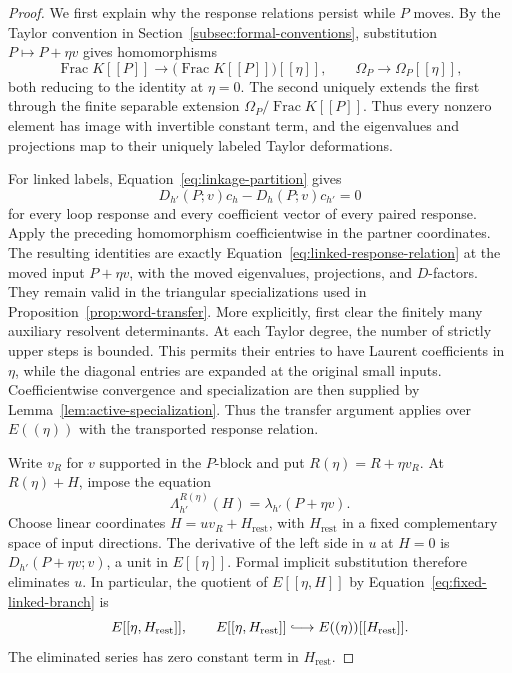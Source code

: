 \begin{proof}
We first explain why the response relations persist while $P$ moves.
By the Taylor convention in Section~\ref{subsec:formal-conventions},
substitution $P\mapsto P+\eta v$ gives homomorphisms
\[
 \operatorname{Frac}K[[P]]
 \longrightarrow \bigl(\operatorname{Frac}K[[P]]\bigr)[[\eta]],
 \qquad
 \Omega_P\longrightarrow\Omega_P[[\eta]],
\]
both reducing to the identity at $\eta=0$. The second uniquely
extends the first through the finite separable extension
$\Omega_P/\operatorname{Frac}K[[P]]$. Thus every nonzero element
has image with invertible constant term, and the eigenvalues and
projections map to their uniquely labeled Taylor deformations.

For linked labels, Equation~\eqref{eq:linkage-partition} gives
\begin{equation}
 D_{h'}(P;v)c_h-D_h(P;v)c_{h'}=0
 \label{eq:linked-response-relation}
\end{equation}
for every loop response and every coefficient vector of every paired
response.  Apply the preceding homomorphism coefficientwise in the
partner coordinates.  The resulting identities are exactly
Equation~\eqref{eq:linked-response-relation} at the moved input
$P+\eta v$, with the moved eigenvalues, projections, and $D$-factors.
They remain valid in the triangular specializations used in
Proposition~\ref{prop:word-transfer}.  More explicitly, first clear the
finitely many auxiliary resolvent determinants.  At each Taylor degree,
the number of strictly upper steps is bounded.  This permits their
entries to have Laurent coefficients in $\eta$, while the diagonal
entries are expanded at the original small inputs.  Coefficientwise
convergence and specialization are then supplied by
Lemma~\ref{lem:active-specialization}.  Thus the transfer argument
applies over $E((\eta))$ with the transported response relation.

Write $v_R$ for $v$ supported in the $P$-block and put
$R(\eta)=R+\eta v_R$.  At $R(\eta)+H$, impose the equation
\begin{equation}
 \Lambda_{h'}^{R(\eta)}(H)=\lambda_{h'}(P+\eta v).
 \label{eq:fixed-linked-branch}
\end{equation}
Choose linear coordinates $H=u v_R+H_{\mathrm{rest}}$, with
$H_{\mathrm{rest}}$ in a fixed complementary space of input directions.
The derivative of the left side in $u$ at $H=0$ is
$D_{h'}(P+\eta v;v)$, a unit in $E[[\eta]]$.  Formal implicit
substitution therefore eliminates $u$.  In particular, the quotient
of $E[[\eta,H]]$ by Equation~\eqref{eq:fixed-linked-branch} is
\begin{equation}
 E[[\eta,H_{\mathrm{rest}}]],
 \qquad
 E[[\eta,H_{\mathrm{rest}}]]
 \lhook\joinrel\longrightarrow
 E((\eta))[[H_{\mathrm{rest}}]].
 \label{eq:linkage-quotient-injection}
\end{equation}
The eliminated series has zero constant term in $H_{\mathrm{rest}}$.


\end{proof}
